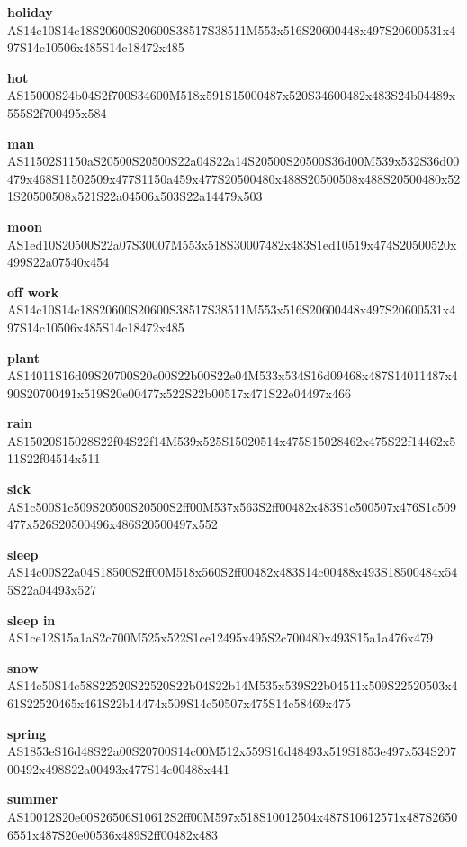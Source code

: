 \documentclass{article}
\begin{document}
\begin{glossary}
\textbf{holiday}\\
AS14c10S14c18S20600S20600S38517S38511M553x516S20600448x497S20600531x497S14c10506x485S14c18472x485

\textbf{hot}\\
AS15000S24b04S2f700S34600M518x591S15000487x520S34600482x483S24b04489x555S2f700495x584

\textbf{man}\\
AS11502S1150aS20500S20500S22a04S22a14S20500S20500S36d00M539x532S36d00479x468S11502509x477S1150a459x477S20500480x488S20500508x488S20500480x521S20500508x521S22a04506x503S22a14479x503

\textbf{moon}\\
AS1ed10S20500S22a07S30007M553x518S30007482x483S1ed10519x474S20500520x499S22a07540x454

\textbf{off work}\\
AS14c10S14c18S20600S20600S38517S38511M553x516S20600448x497S20600531x497S14c10506x485S14c18472x485

\textbf{plant}\\
AS14011S16d09S20700S20e00S22b00S22e04M533x534S16d09468x487S14011487x490S20700491x519S20e00477x522S22b00517x471S22e04497x466

\textbf{rain}\\
AS15020S15028S22f04S22f14M539x525S15020514x475S15028462x475S22f14462x511S22f04514x511

\textbf{sick}\\
AS1c500S1c509S20500S20500S2ff00M537x563S2ff00482x483S1c500507x476S1c509477x526S20500496x486S20500497x552

\textbf{sleep}\\
AS14c00S22a04S18500S2ff00M518x560S2ff00482x483S14c00488x493S18500484x545S22a04493x527

\textbf{sleep in}\\
AS1ce12S15a1aS2c700M525x522S1ce12495x495S2c700480x493S15a1a476x479

\textbf{snow}\\
AS14c50S14c58S22520S22520S22b04S22b14M535x539S22b04511x509S22520503x461S22520465x461S22b14474x509S14c50507x475S14c58469x475

\textbf{spring}\\
AS1853eS16d48S22a00S20700S14c00M512x559S16d48493x519S1853e497x534S20700492x498S22a00493x477S14c00488x441

\textbf{summer}\\
AS10012S20e00S26506S10612S2ff00M597x518S10012504x487S10612571x487S26506551x487S20e00536x489S2ff00482x483


\end{glossary}
\end{document}
